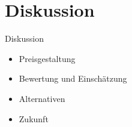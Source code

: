 
\section{Diskussion}

\begin{frame}{Diskussion}
    \begin{itemize}
        \item Preisgestaltung
        \item Bewertung und Einschätzung
        \item Alternativen
        \item Zukunft
    \end{itemize}
\end{frame}
